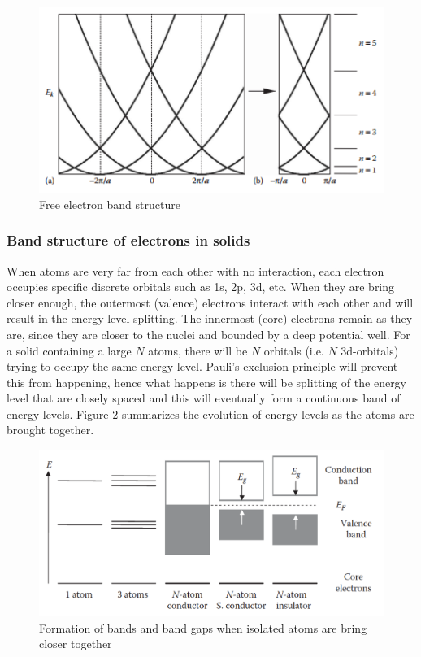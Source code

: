  \begin{figure}[tbh!]
	\centering
	\includegraphics[width=0.7\linewidth]{"images/free electron"}
	\caption[Free electron band structure]{Free electron band structure}
	\label{fig:free-electron}
\end{figure}

\subsubsection{Band structure of electrons in solids}
When atoms are very far from each other with no interaction, each electron occupies specific discrete orbitals such as 1s, 2p, 3d, etc. When they are bring  closer enough, the outermost (valence) electrons interact with each other and will result in the  energy level splitting. The innermost (core) electrons remain as they are, since they are closer to the nuclei and bounded by a deep potential well. For a solid containing a large $N$ atoms, there will be $N$ orbitals (i.e. $N$ 3d-orbitals) trying to occupy the same energy level. Pauli's exclusion principle will prevent this from happening, hence what happens is there will be splitting of the energy level that are closely spaced and this will eventually form a continuous band of energy levels. Figure \ref{fig:band_model} summarizes the evolution of energy levels as the atoms are brought together.

\begin{figure}[tbh!]
	\centering
	\includegraphics[width=0.7\linewidth]{"images/band model"}
	\caption[Band structure in solids]{Formation of bands and band gaps when isolated atoms are bring closer together}
	\label{fig:band_model}
\end{figure}    

